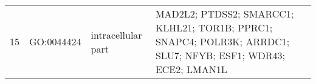 \begin{table}[htp]
\begin{center}
\begin{tabular}{|c|c|p{1.5in}|p{4in}|}
  15 & GO:0044424 & intracellular part & \footnotesize{MAD2L2; PTDSS2; SMARCC1; KLHL21; TOR1B; PPRC1; SNAPC4; POLR3K; ARRDC1; SLU7; NFYB; ESF1; WDR43; ECE2; LMAN1L} \\ 

\end{tabular}
\end{center}
\end{table}

